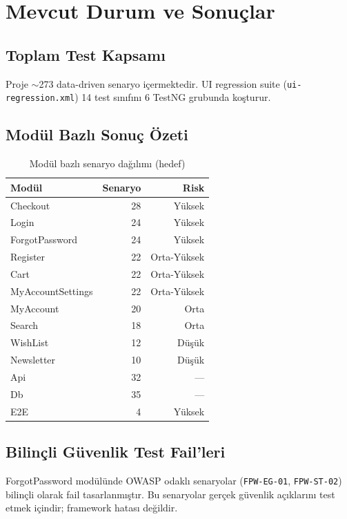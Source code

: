 \chapter{Mevcut Durum ve Sonuçlar}

\section{Toplam Test Kapsamı}
Proje $\sim$273 data-driven senaryo içermektedir. UI regression suite (\texttt{ui-regression.xml}) 14 test sınıfını 6 TestNG grubunda koşturur.

\section{Modül Bazlı Sonuç Özeti}

\begin{table}[H]
  \centering
  \caption{Modül bazlı senaryo dağılımı (hedef)}
  \begin{tabular}{@{}lrr@{}}
    \toprule
    \textbf{Modül} & \textbf{Senaryo} & \textbf{Risk} \\
    \midrule
    Checkout & 28 & Yüksek \\
    Login & 24 & Yüksek \\
    ForgotPassword & 24 & Yüksek \\
    Register & 22 & Orta-Yüksek \\
    Cart & 22 & Orta-Yüksek \\
    MyAccountSettings & 22 & Orta-Yüksek \\
    MyAccount & 20 & Orta \\
    Search & 18 & Orta \\
    WishList & 12 & Düşük \\
    Newsletter & 10 & Düşük \\
    Api & 32 & — \\
    Db & 35 & — \\
    E2E & 4 & Yüksek \\
    \bottomrule
  \end{tabular}
\end{table}

\section{Bilinçli Güvenlik Test Fail'leri}
ForgotPassword modülünde OWASP odaklı senaryolar (\texttt{FPW-EG-01}, \texttt{FPW-ST-02}) bilinçli olarak fail tasarlanmıştır. Bu senaryolar gerçek güvenlik açıklarını test etmek içindir; framework hatası değildir.

